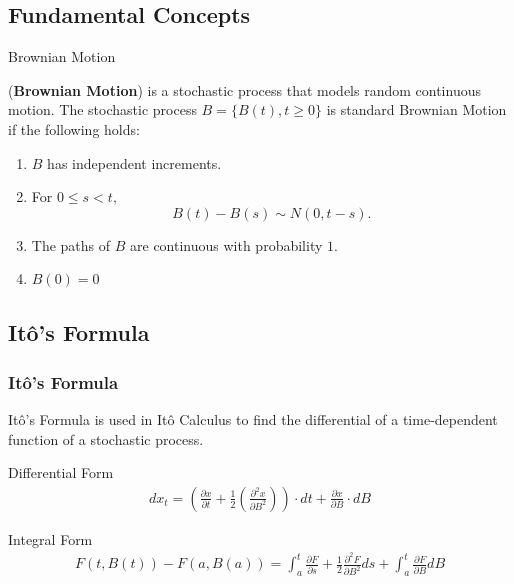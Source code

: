 \subsection{Fundamental Concepts}


\begin{frame}{Brownian Motion}
\begin{definition}(\textbf{Brownian Motion}) is a stochastic process that models random continuous motion. The stochastic process $B=\{B(t), t\geq 0\}$ is standard Brownian Motion if the following holds:
\begin{enumerate}
\item $B$ has independent increments.
\item For $0 \leq s < t,$ $$B(t)-B(s) \sim N(0,t-s).$$
\item The paths of $B$ are continuous with probability $1$.
\item $B(0)=0$ 
\end{enumerate}
\end{definition}
\end{frame}

\subsection{It\^o's Formula}

\begin{frame}
\frametitle{It\^o's Formula}
It\^o's Formula is used in It\^o Calculus to find the differential of a time-dependent function of a stochastic process.
\vfill

		 \begin{block}{Differential Form}
      \begin{align*}
				\displaystyle dx_t =\left(\frac{\partial x}{\partial t} + \frac{1}{2} \left(\frac{\partial ^2 x}{\partial B ^2}\right)\right) \cdot  dt + \frac{\partial x}{\partial B} \cdot dB 
			\end{align*}
    \end{block}
		
\vfill

		\begin{block}{Integral Form}
      \begin{align*}
				\displaystyle F(t, B(t))-F(a,B(a))=
 \int_{a}^{t} \frac{\partial F}{\partial s} + \frac{1}{2} \frac{\partial^2 F}{\partial B^2}ds+
 \int_a^t \frac{\partial F}{\partial B} dB
			\end{align*}
    \end{block}

\vfill
\end{frame}

